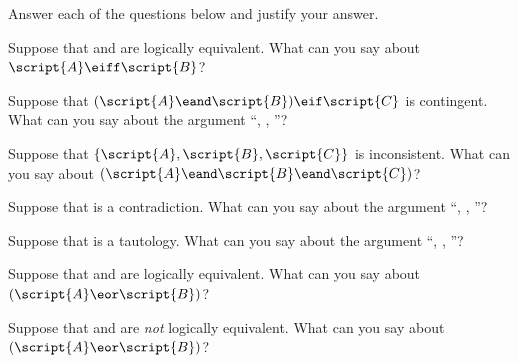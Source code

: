 \solutions
\problempart
\label{pr.TT.concepts}
Answer each of the questions below and justify your answer.
\begin{earg}
\item Suppose that  and  are logically equivalent. What can you say about $\script{A}\eiff\script{B}$?
\item Suppose that $(\script{A}\eand\script{B})\eif\script{C}$ is contingent. What can you say about the argument ``, , \therefore{}''?
\item Suppose that $\{\script{A},\script{B}, \script{C}\}$ is inconsistent. What can you say about $(\script{A}\eand\script{B}\eand\script{C})$?
\item Suppose that  is a contradiction. What can you say about the argument ``, , \therefore{}''?
\item Suppose that  is a tautology. What can you say about the argument ``, , \therefore{}''?
\item Suppose that  and  are logically equivalent. What can you say about $(\script{A}\eor\script{B})$?
\item Suppose that  and  are \emph{not} logically equivalent. What can you say about $(\script{A}\eor\script{B})$?
\end{earg}


